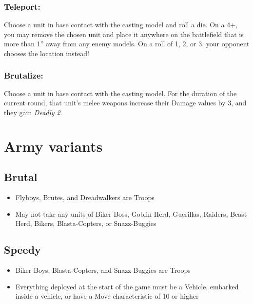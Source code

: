 \subsubsection*{Teleport:} Choose a unit in base contact with the casting model and roll a die. On a 4+, you may remove the chosen unit and place it anywhere on the battlefield that is more than 1'' away from any enemy models. On a roll of 1, 2, or 3, your opponent chooses the location instead!

\subsubsection*{Brutalize:} Choose a unit in base contact with the casting model. For the duration of the current round, that unit's melee weapons increase their Damage values by 3, and they gain \textit{Deadly 2}.


\section*{Army variants}
\subsection*{Brutal}
\begin{itemize}
    \item Flyboys, Brutes, and Dreadwalkers are Troops
    \item May not take any units of Biker Boss, Goblin Herd, Guerillas, Raiders, Beast Herd, Bikers, Blasta-Copters, or Snazz-Buggies
\end{itemize}

\subsection*{Speedy}
\begin{itemize}
    \item Biker Boys, Blasta-Copters, and Snazz-Buggies are Troops
    \item Everything deployed at the start of the game must be a Vehicle, embarked inside a vehicle, or have a Move characteristic of 10 or higher
\end{itemize}




\pagebreak



